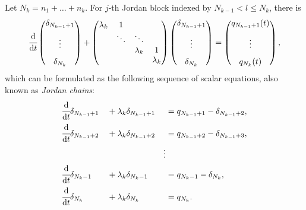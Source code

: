 \documentclass[]{uai2023}
\newcommand{\dt}[1]{\cfrac{\mathrm{d} #1}{\mathrm{d} t}}
\begin{document}
    Let $N_k = n_1+\dots + n_k$. For $j$-th Jordan block indexed by $N_{k-1} < l \leq N_k$, there is
    \begin{equation}
        \dt{}
        \begin{pmatrix}
            \delta_{N_{k-1} + 1} \\[0.8em] \vdots \\[0.8em] \delta_{N_k}
        \end{pmatrix} 
        + 
        \begin{pmatrix}
            \lambda_k & 1 \\
            & \ddots & \ddots \\
            & & \lambda_k & 1\\
            & & & \lambda_k \\
        \end{pmatrix}
        \begin{pmatrix}
            \delta_{N_{k-1} + 1} \\[0.8em] \vdots \\[0.8em] \delta_{N_k}
        \end{pmatrix} 
        =
        \begin{pmatrix}
            q_{N_{k-1} + 1}(t) \\[0.8em] \vdots \\[0.8em] q_{N_k}(t)
        \end{pmatrix},
    \end{equation}
    which can be formulated as the following sequence of scalar equations, also known as \textit{Jordan chains}:
    \begin{alignat}{4}
        &\dt{}\delta_{N_{k-1} + 1} &&+\lambda_k\delta_{N_{k-1} + 1} &&= q_{N_{k-1}+1} - \delta_{N_{k-1}+2}, \label{eq:jordan-chain-first}\\
        &\dt{}\delta_{N_{k-1} + 2} &&+\lambda_k\delta_{N_{k-1} + 2} &&= q_{N_{k-1}+2} - \delta_{N_{k-1}+3}, \label{eq:jordan-chain-second}\\
        &&&& \vdots \nonumber\\
        &\dt{}\delta_{N_k-1} &&+\lambda_k\delta_{N_k-1} &&= q_{N_k-1} - \delta_{N_k}, \label{eq:jordan-chain-second2last}\\
        &\dt{}\delta_{N_k} && + \lambda_k\delta_{N_k} & &= q_{N_k}. \label{eq:jordan-chain-last}
    \end{alignat}
\end{document}
